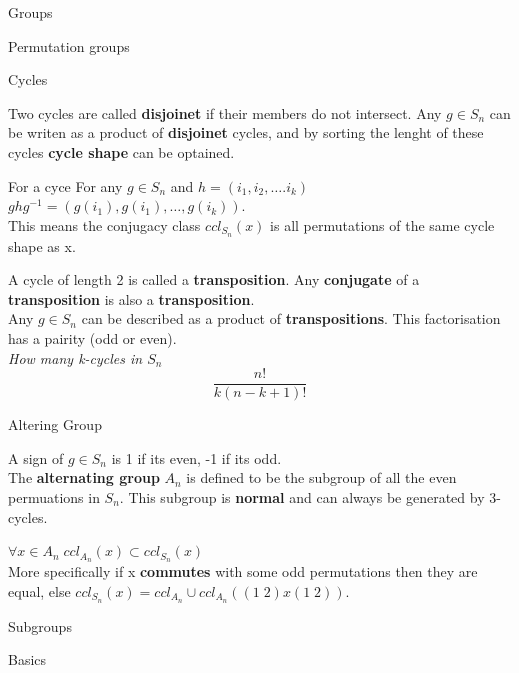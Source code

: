 \documentclass[12pt, letterpaper]{article}
\begin{document}
\begin{section}{Groups}
\begin{subsection}{Permutation groups}
    \begin{subsubsection}{Cycles}

      Two cycles are called \textbf{disjoinet} if their members do not intersect.
      Any \(g \in S_{n}\) can be writen as a product of \textbf{disjoinet}
      cycles, and by sorting the lenght of these cycles \textbf{cycle shape} can
      be optained.

      For a cyce For any \(g \in S_{n}\) and
      \(h = (i_{1}, i_{2}, \dots . i_{k})\)
      \(ghg^{-1} = (g(i_{1}), g(i_{1}), \dots , g(i_{k}))\). \\
      This means the conjugacy class \(ccl_{S_{n}}(x)\) is all permutations of
      the same cycle shape as x.

      A cycle of length 2 is called a \textbf{transposition}. Any
      \textbf{conjugate} of a \textbf{transposition} is also a
      \textbf{transposition}. \\

      Any \(g \in S_{n}\) can be described as a product of
      \textbf{transpositions}.
      This factorisation has a pairity (odd or even). \\

      \emph{How many k-cycles in \(S_{n}\) \[\frac{n!}{k(n-k+1)!}\]}

    \end{subsubsection}

    \begin{subsubsection}{Altering Group}

      A sign of \(g \in S_{n}\) is 1 if its even, -1 if its odd. \\
      The \textbf{alternating group} \(A_{n}\) is defined to be the subgroup of
      all the even permuations in \(S_{n}\). This subgroup is \textbf{normal} and
      can always be generated by 3-cycles.

      \emph{\(\forall x \in A_{n} \; ccl_{A_{n}}(x) \subset ccl_{S_{n}}(x)\)} \\
      More specifically if x \textbf{commutes} with some odd permutations then
      they are equal, else
      \(ccl_{S_{n}}(x) = ccl_{A_{n}} \cup ccl_{A_{n}}((1 \; 2) x (1 \; 2))\).

    \end{subsubsection}

  \end{subsection}

  \begin{subsection}{Subgroups}

    \begin{subsubsection}{Basics}


\end{subsubsection}
\end{subsection}
\end{section}
\end{document}
